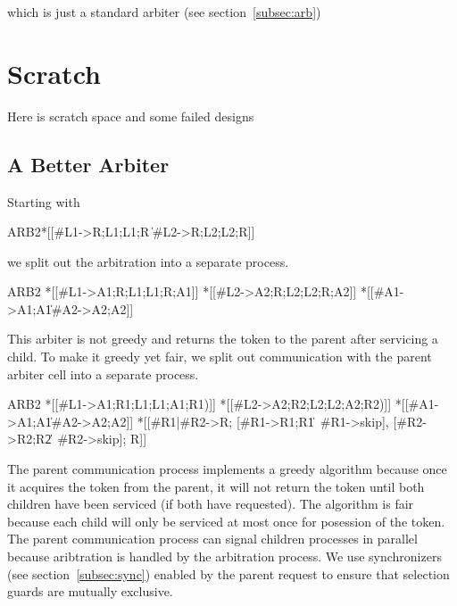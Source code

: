 \documentclass[aer.tex]{subfiles}
\begin{document}
\noindent which is just a standard arbiter (see section~\ref{subsec:arb})

\section{Scratch}

Here is scratch space and some failed designs

\subsection{A Better Arbiter}

Starting with

\begin{csp}
ARB2\equiv*
  *[[#{L1}->R;L1;L1;R
    \|#{L2}->R;L2;L2;R]]
\end{csp}

we split out the arbitration into a separate process.

\begin{csp}
ARB2\equiv
*[[#{L1}->A1;R;L1;L1;R;A1]] \pll
*[[#{L2}->A2;R;L2;L2;R;A2]] \pll
*[[#{A1}->A1;A1\|#{A2}->A2;A2]]
\end{csp}

This arbiter is not greedy and returns the token to the parent after servicing a child.
To make it greedy yet fair, we split out communication with the parent arbiter cell into a separate process.

\begin{csp}
ARB2\equiv
  *[[#{L1}->A1;R1;L1;L1;A1;R1)]] \pll
  *[[#{L2}->A2;R2;L2;L2;A2;R2)]] \pll
  *[[#{A1}->A1;A1\|#{A2}->A2;A2]]\pll
  *[[#{R1}|#{R2}->R;
    [#{R1}->R1;R1\|~#{R1}->skip],
    [#{R2}->R2;R2\|~#{R2}->skip];
    R]]
\end{csp}

The parent communication process implements a greedy algorithm because once it acquires the token from the parent,
it will not return the token until both children have been serviced (if both have requested). 
The algorithm is fair because each child will only be serviced at most once for posession of the token.
The parent communication process can signal children processes in parallel because aribtration is handled by the arbitration process.
We use synchronizers (see section~\ref{subsec:sync}) enabled by the parent request to ensure that selection guards are mutually exclusive.
\end{document}
